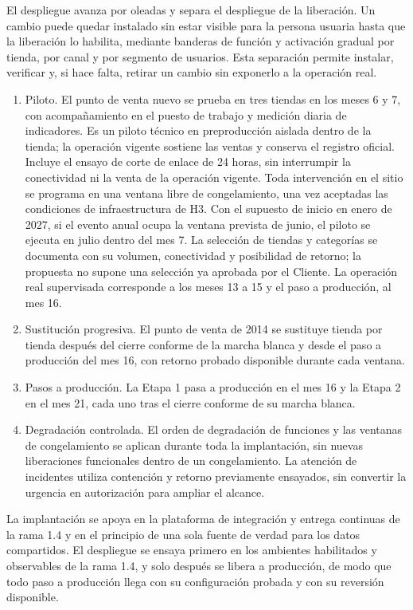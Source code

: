 \documentclass[11pt]{article}
\begin{document}
El despliegue avanza por oleadas y separa el despliegue de la liberación. Un cambio puede quedar instalado sin estar visible para la persona usuaria hasta que la liberación lo habilita, mediante banderas de función y activación gradual por tienda, por canal y por segmento de usuarios. Esta separación permite instalar, verificar y, si hace falta, retirar un cambio sin exponerlo a la operación real.

\begin{enumerate}
\item Piloto. El punto de venta nuevo se prueba en tres tiendas en los meses 6 y 7, con acompañamiento en el puesto de trabajo y medición diaria de indicadores. Es un piloto técnico en preproducción aislada dentro de la tienda; la operación vigente sostiene las ventas y conserva el registro oficial. Incluye el ensayo de corte de enlace de 24 horas, sin interrumpir la conectividad ni la venta de la operación vigente. Toda intervención en el sitio se programa en una ventana libre de congelamiento, una vez aceptadas las condiciones de infraestructura de H3. Con el supuesto de inicio en enero de 2027, si el evento anual ocupa la ventana prevista de junio, el piloto se ejecuta en julio dentro del mes 7. La selección de tiendas y categorías se documenta con su volumen, conectividad y posibilidad de retorno; la propuesta no supone una selección ya aprobada por el Cliente. La operación real supervisada corresponde a los meses 13 a 15 y el paso a producción, al mes 16.
\item Sustitución progresiva. El punto de venta de 2014 se sustituye tienda por tienda después del cierre conforme de la marcha blanca y desde el paso a producción del mes 16, con retorno probado disponible durante cada ventana.
\item Pasos a producción. La Etapa 1 pasa a producción en el mes 16 y la Etapa 2 en el mes 21, cada uno tras el cierre conforme de su marcha blanca.
\item Degradación controlada. El orden de degradación de funciones y las ventanas de congelamiento se aplican durante toda la implantación, sin nuevas liberaciones funcionales dentro de un congelamiento. La atención de incidentes utiliza contención y retorno previamente ensayados, sin convertir la urgencia en autorización para ampliar el alcance.
\end{enumerate}

La implantación se apoya en la plataforma de integración y entrega continuas de la rama 1.4 y en el principio de una sola fuente de verdad para los datos compartidos. El despliegue se ensaya primero en los ambientes habilitados y observables de la rama 1.4, y solo después se libera a producción, de modo que todo paso a producción llega con su configuración probada y con su reversión disponible.
\end{document}
